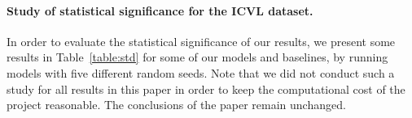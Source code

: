 \paragraph{Study of statistical significance for the ICVL dataset.} In order to evaluate the statistical significance of our results, we
present some results in Table~\ref{table:std} for some of our models and baselines, by running models with five different random seeds.
Note that we did not conduct such a study for all results in this paper in order to keep the computational cost of the project reasonable.
The conclusions of the paper remain unchanged.

\begin{table}[H]
	\centering
	\label{table:std}
\end{table}
